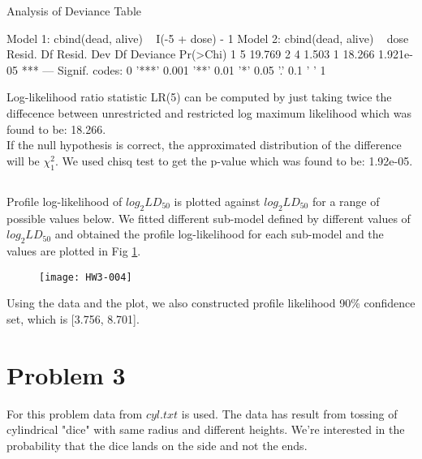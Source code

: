 \documentclass{article}
\begin{document}
\begin{Schunk}
\begin{Soutput}
Analysis of Deviance Table

Model 1: cbind(dead, alive) ~ I(-5 + dose) - 1
Model 2: cbind(dead, alive) ~ dose
  Resid. Df Resid. Dev Df Deviance  Pr(>Chi)    
1         5     19.769                          
2         4      1.503  1   18.266 1.921e-05 ***
---
Signif. codes:  0 '***' 0.001 '**' 0.01 '*' 0.05 '.' 0.1 ' ' 1
\end{Soutput}
\end{Schunk}
Log-likelihood ratio statistic LR(5) can be computed by just taking twice the diffecence between unrestricted and restricted log maximum likelihood which was found to be: 18.266.\\
If the null hypothesis is correct, the approximated distribution of the difference will be $\chi^2_1$.
We used chisq test to get the p-value which was found to be: 1.92e-05.\\


\subsection{}
Profile log-likelihood of $log_2LD_{50}$ is plotted against $log_2LD_{50}$ for a range of possible values below. We fitted different sub-model defined by different values of $log_2LD_{50}$ and obtained the profile log-likelihood for each sub-model and the values are plotted in Fig \ref{Fig1}.
\begin{figure}[H]
\centering
\texttt{[image: HW3-004]}
\caption{}
\label{Fig1}
\end{figure}


Using the data and the plot, we also constructed profile likelihood 90\% confidence set, which is [3.756, 8.701].\\

\section{Problem 3}
For this problem data from $cyl.txt$ is used. The data has result from tossing of cylindrical "dice" with same radius and different heights. We're interested in the probability that the dice lands on the side and not the ends.
\end{document}
